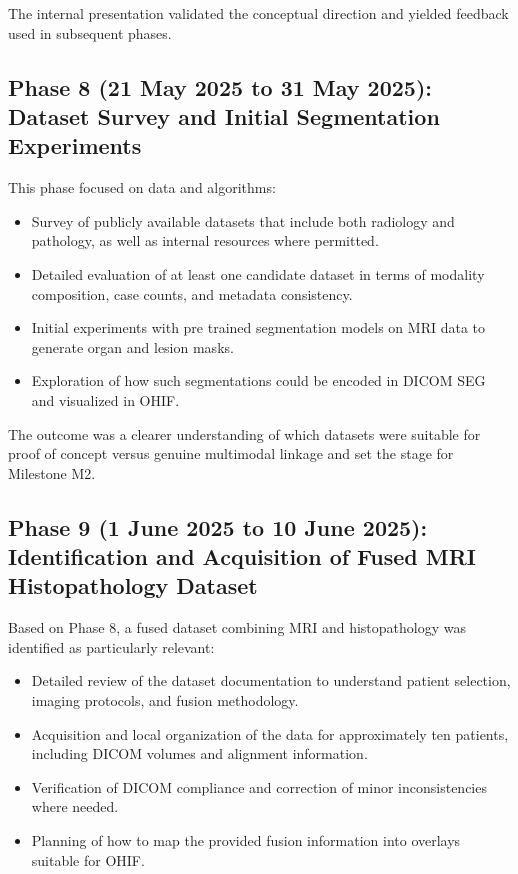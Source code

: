 \documentclass[11pt,a4paper]{article}
\begin{document}
The internal presentation validated the conceptual direction and yielded feedback used in subsequent phases.

\subsection*{Phase 8 (21 May 2025 to 31 May 2025): Dataset Survey and Initial Segmentation Experiments}

This phase focused on data and algorithms:

\begin{itemize}
    \item Survey of publicly available datasets that include both radiology and pathology, as well as internal resources where permitted.
    \item Detailed evaluation of at least one candidate dataset in terms of modality composition, case counts, and metadata consistency.
    \item Initial experiments with pre trained segmentation models on MRI data to generate organ and lesion masks.
    \item Exploration of how such segmentations could be encoded in DICOM SEG and visualized in OHIF.
\end{itemize}

The outcome was a clearer understanding of which datasets were suitable for proof of concept versus genuine multimodal linkage and set the stage for Milestone M2.

\subsection*{Phase 9 (1 June 2025 to 10 June 2025): Identification and Acquisition of Fused MRI Histopathology Dataset}

Based on Phase 8, a fused dataset combining MRI and histopathology was identified as particularly relevant:

\begin{itemize}
    \item Detailed review of the dataset documentation to understand patient selection, imaging protocols, and fusion methodology.
    \item Acquisition and local organization of the data for approximately ten patients, including DICOM volumes and alignment information.
    \item Verification of DICOM compliance and correction of minor inconsistencies where needed.
    \item Planning of how to map the provided fusion information into overlays suitable for OHIF.
\end{itemize}
\end{document}
